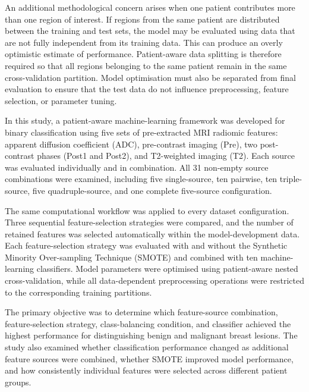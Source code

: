 \documentclass[12pt,twocolumn]{article}
\begin{document}
An additional methodological concern arises when one patient contributes
more than one region of interest. If regions from the same patient are
distributed between the training and test sets, the model may be evaluated
using data that are not fully independent from its training data. This can
produce an overly optimistic estimate of performance. Patient-aware data
splitting is therefore required so that all regions belonging to the same
patient remain in the same cross-validation partition. Model optimisation
must also be separated from final evaluation to ensure that the test data do
not influence preprocessing, feature selection, or parameter tuning.

In this study, a patient-aware machine-learning framework was developed for
binary classification using five sets of pre-extracted MRI radiomic features:
apparent diffusion coefficient (ADC), pre-contrast imaging (Pre), two
post-contrast phases (Post1 and Post2), and T2-weighted imaging (T2). Each
source was evaluated individually and in combination. All 31 non-empty
source combinations were examined, including five single-source, ten
pairwise, ten triple-source, five quadruple-source, and one complete
five-source configuration.

The same computational workflow was applied to every dataset configuration.
Three sequential feature-selection strategies were compared, and the number
of retained features was selected automatically within the model-development
data. Each feature-selection strategy was evaluated with and without the
Synthetic Minority Over-sampling Technique (SMOTE) and combined with ten
machine-learning classifiers. Model parameters were optimised using
patient-aware nested cross-validation, while all data-dependent preprocessing
operations were restricted to the corresponding training partitions.

The primary objective was to determine which feature-source combination,
feature-selection strategy, class-balancing condition, and classifier
achieved the highest performance for distinguishing benign and malignant
breast lesions. The study also examined whether classification performance
changed as additional feature sources were combined, whether SMOTE improved
model performance, and how consistently individual features were selected
across different patient groups.
\end{document}
